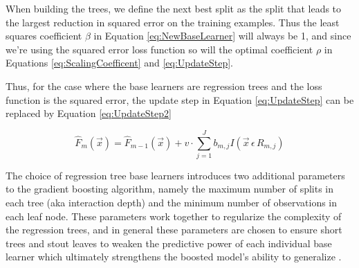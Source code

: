 \documentclass[9pt, conference]{IEEEtran}
\begin{document}
When building the trees, we define the next best split as the split that leads to the largest reduction in squared error on the training examples. Thus the least squares coefficient \(\beta\) in Equation \ref{eq:NewBaseLearner} will always be 1, and since we're using the squared error loss function so will the optimal coefficient \(\rho\) in Equations \ref{eq:ScalingCoefficent} and \ref{eq:UpdateStep}. 


Thus, for the case where the base learners are regression trees and the loss function is the squared error, the update step in Equation \ref{eq:UpdateStep} can be replaced by Equation \ref{eq:UpdateStep2}

\begin{equation}
\hat{F}_m(\vec{x}) = \hat{F}_{m-1}(\vec{x}) + v  \cdot \sum_{j=1}^{J}b_{m,j}I(\vec{x} \, \epsilon \, R_{m,j})
\label{eq:UpdateStep2}
\end{equation}

The choice of regression tree base learners introduces two additional parameters to the gradient boosting algorithm, namely the maximum number of splits in each tree (aka interaction depth) and the minimum number of observations in each leaf node. These parameters work together to regularize the complexity of the regression trees, and in general these parameters are chosen to ensure short trees and stout leaves to weaken the predictive power of each individual base learner which ultimately strengthens the boosted model's ability to generalize \cite{ecological}. 
\end{document}
